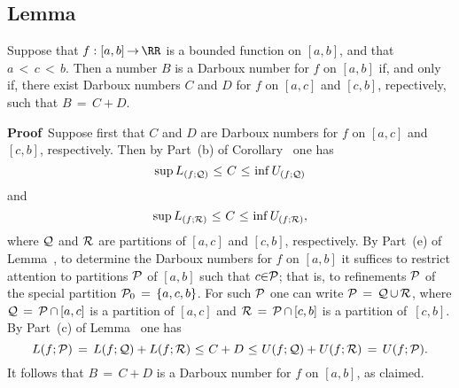 \V

        \subsection{\small{{\bf Lemma}}}
        \label{LemmaH25.10}

\V

        Suppose that $f:[a,b] \,{\rightarrow}\, {\RR}$ is a bounded function on $[a,b]$, and that $a\,<\,c\,<\,b$.
    Then a number $B$ is a Darboux number for $f$ on $[a,b]$ if, and only if, there exist Darboux numbers $C$ and $D$ for $f$ on $[a,c]$ and $[c,b]$, 
    repectively, such that $B \,=\, C+D$.

\V

        {\bf Proof}\, Suppose first that $C$ and $D$ are Darboux numbers for $f$ on $[a,c]$ and $[c,b]$, respectively.
    Then by Part~(b) of Corollary~ one has
        \begin{displaymath}
        {\sup}\,L_{(f;{\cal Q})}\,\,{\leq}\,\,C\,\,{\leq}\,\,{\inf}\,U_{(f;{\cal Q})}
        \end{displaymath}
    and
        \begin{displaymath}
        {\sup}\,L_{(f;{\cal R})}\,\,{\leq}\,\,C\,\,{\leq}\,\,{\inf}\,U_{(f;{\cal R})},
        \end{displaymath}
    where ${\cal Q}$ and ${\cal R}$ are partitions of $[a,c]$ and $[c,b]$, respectively.
    By Part~(e) of Lemma~, to determine the Darboux numbers for $f$ on $[a,b]$ it suffices to restrict attention to partitions ${\cal P}$ of $[a,b]$ such that $c{\in}{\cal P}$;
    that is, to refinements ${\cal P}$ of the special partition ${\cal P}_{0} \,=\, \{a,c,b\}$. For such ${\cal P}$ one can write ${\cal P} \,=\, {\cal Q}\,{\cup}\,{\cal R}$,
    where ${\cal Q} \,=\, {\cal P}\,{\cap}\,[a,c]$ is a partition of $[a,c]$ and ${\cal R} \,=\, {\cal P}\,{\cap}\,[c,b]$ is a partition of~$[c,b]$.
    By Part~(c) of Lemma~ one has
        \begin{displaymath}
        L(f;{\cal P}) \,=\, L(f;{\cal Q}) + L(f;{\cal R})\,\,{\leq}\,\,C+D
    \,\,{\leq}\,\,
        U(f;{\cal Q}) + U(f;{\cal R}) \,=\, U(f;{\cal P}).
        \end{displaymath}
    It follows that $B \,=\, C+D$ is a Darboux number for $f$ on $[a,b]$, as claimed.

